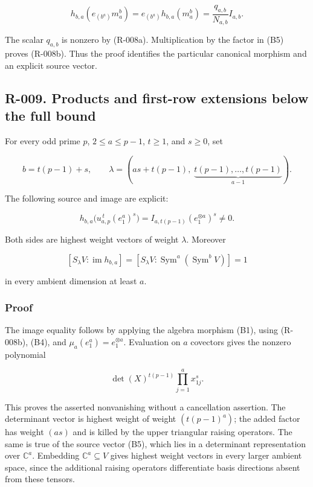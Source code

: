 \documentclass[
  10pt,
]{article}
\begin{document}
\[
 h_{b,a}(e_{(b^a)}m_a^b)
   =e_{(b^a)}h_{b,a}(m_a^b)
   =\frac{q_{a,b}}{N_{a,b}}I_{a,b}.
\]

The scalar \(q_{a,b}\) is nonzero by (R-008a). Multiplication by the
factor in (B5) proves (R-008b). Thus the proof identifies the particular
canonical morphism and an explicit source vector.

\subsection{R-009. Products and first-row extensions below the full
bound}\label{r-009.-products-and-first-row-extensions-below-the-full-bound}

For every odd prime \(p\), \(2\le a\le p-1\), \(t\ge1\), and \(s\ge0\),
set

\[
 b=t(p-1)+s,\qquad
 \lambda=(as+t(p-1),\;\underbrace{t(p-1),\ldots,t(p-1)}_{a-1}).
\]

The following source and image are explicit:

\[
 \boxed{
 h_{b,a}\bigl(u_{a,p}^{\,t}(e_1^a)^s\bigr)
   =I_{a,t(p-1)}(e_1^{\otimes a})^s\ne0.
 }
 \tag{R-009a}
\]

Both sides are highest weight vectors of weight \(\lambda\). Moreover

\[
 [S_\lambda V:\operatorname{im}h_{b,a}]
   =[S_\lambda V:\operatorname{Sym}^a(\operatorname{Sym}^bV)]=1
 \tag{R-009b}
\]

in every ambient dimension at least \(a\).

\subsubsection{Proof}\label{proof-2}

The image equality follows by applying the algebra morphism (B1), using
(R-008b), (B4), and \(\mu_a(e_1^a)=e_1^{\otimes a}\). Evaluation on
\(a\) covectors gives the nonzero polynomial

\[
 \det(X)^{t(p-1)}\prod_{j=1}^a x_{1j}^{s}.
\]

This proves the asserted nonvanishing without a cancellation assertion.
The determinant vector is highest weight of weight \((t(p-1)^a)\); the
added factor has weight \((as)\) and is killed by the upper triangular
raising operators. The same is true of the source vector (B5), which
lies in a determinant representation over \(\mathbb C^a\). Embedding
\(\mathbb C^a\subseteq V\) gives highest weight vectors in every larger
ambient space, since the additional raising operators differentiate
basis directions absent from these tensors.
\end{document}
